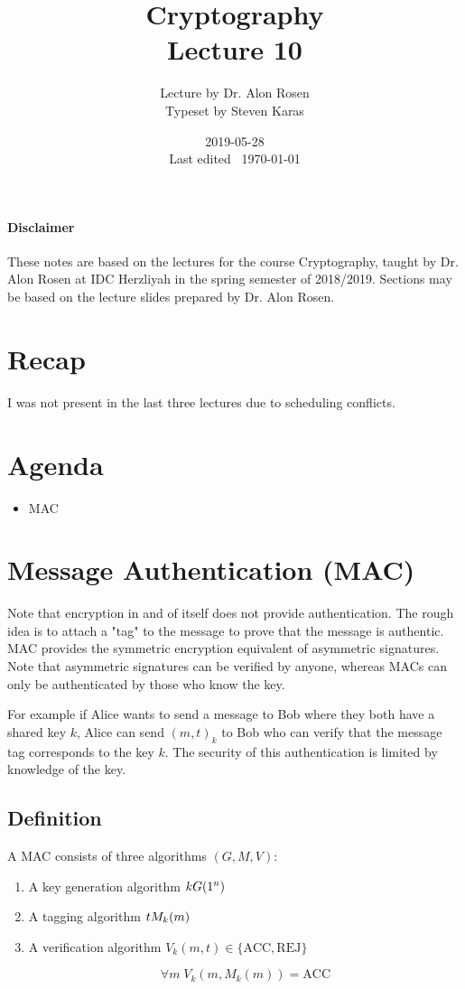 \documentclass{idc_msc}
\title{Cryptography \\\large Lecture 10}
\date{2019-05-28 \\ Last edited \currenttime\ \today}
\author{Lecture by Dr. Alon Rosen\\Typeset by Steven Karas}
\let\getsrandom\relax
\newcommand{\getsrandom}{\ensuremath{\overset{R}{\gets}}}
\begin{document}
\paragraph{Disclaimer}

These notes are based on the lectures for the course Cryptography, taught by Dr. Alon Rosen at IDC Herzliyah in the spring semester of 2018/2019.
Sections may be based on the lecture slides prepared by Dr. Alon Rosen.

\nocite{Katz:2014:IMC:2700550}

\section{Recap}

I was not present in the last three lectures due to scheduling conflicts.

\section{Agenda}

\begin{itemize}
  \item MAC
\end{itemize}

\section{Message Authentication (MAC)}

Note that encryption in and of itself does not provide authentication.
The rough idea is to attach a "tag" to the message to prove that the message is authentic.
MAC provides the symmetric encryption equivalent of asymmetric signatures.
Note that asymmetric signatures can be verified by anyone, whereas MACs can only be authenticated by those who know the key.

For example if Alice wants to send a message to Bob where they both have a shared key \(k\), Alice can send \((m, t)_k\) to Bob who can verify that the message tag corresponds to the key \(k\).
The security of this authentication is limited by knowledge of the key.

\subsection{Definition}

A MAC consists of three algorithms \((G, M, V)\):

\begin{enumerate}
  \item A key generation algorithm \(k \getsrandom G(1^n)\)
  \item A tagging algorithm \(t \getsrandom M_k(m)\)
  \item A verification algorithm \(V_k(m, t) \in \{\mathrm{ACC}, \mathrm{REJ}\}\)

  \[
  \forall m \; V_k(m, M_k(m)) = \mathrm{ACC}
  \]
\end{enumerate}
\end{document}
